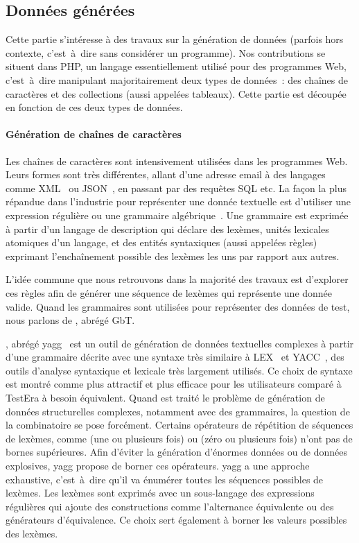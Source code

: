\subsection{Données générées}

Cette partie s'intéresse à des travaux sur la génération de données (parfois
hors contexte, c'est~à~dire sans considérer un programme). Nos contributions se
situent dans PHP, un langage essentiellement utilisé pour des programmes Web,
c'est~à~dire manipulant majoritairement deux types de données~: des chaînes de
caractères et des collections (aussi appelées tableaux). Cette partie est
découpée en fonction de ces deux types de données.

\paragraph{Génération de chaînes de caractères} Les chaînes de caractères sont
intensivement utilisées dans les programmes Web. Leurs formes sont très
différentes, allant d'une adresse email à des langages comme XML~ ou
JSON~, en passant par des requêtes SQL etc. La façon la plus
répandue dans l'industrie pour représenter une donnée textuelle est d'utiliser
une expression régulière ou une grammaire algébrique~. Une
grammaire est exprimée à partir d'un langage de description qui déclare des
lexèmes, unités lexicales atomiques d'un langage, et des entités syntaxiques
(aussi appelées règles) exprimant l'enchaînement possible des lexèmes les uns
par rapport aux autres.

L'idée commune que nous retrouvons dans la majorité des travaux est d'explorer
ces règles afin de générer une séquence de lexèmes qui représente une donnée
valide. Quand les grammaires sont utilisées pour représenter des données de
test, nous parlons de , abrégé GbT.

, abrégé yagg~ est
un outil de génération de données textuelles complexes à partir d'une grammaire
décrite avec une syntaxe très similaire à LEX~ et
YACC~, des outils d'analyse syntaxique et lexicale très
largement utilisés. Ce choix de syntaxe est montré comme plus attractif et plus
efficace pour les utilisateurs comparé à TestEra à besoin équivalent. Quand est
traité le problème de génération de données structurelles complexes, notamment
avec des grammaires, la question de la combinatoire se pose forcément. Certains
opérateurs de répétition de séquences de lexèmes, comme \code{+} (une ou
plusieurs fois) ou \code{*} (zéro ou plusieurs fois) n'ont pas de bornes
supérieures. Afin d'éviter la génération d'énormes données ou de données
explosives, yagg propose de borner ces opérateurs. yagg a une approche
exhaustive, c'est~à~dire qu'il va énumérer toutes les séquences possibles de
lexèmes. Les lexèmes sont exprimés avec un sous-langage des expressions
régulières qui ajoute des constructions comme l'alternance équivalente ou des
générateurs d'équivalence.  Ce choix sert également à borner les valeurs
possibles des lexèmes.

